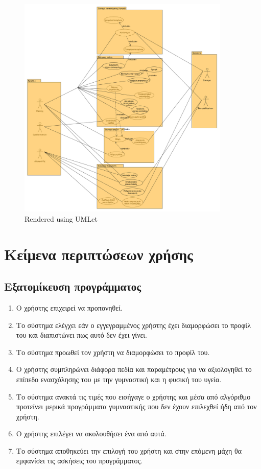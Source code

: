\begin{figure}[htbp]
  
  \centering
    \includegraphics[width=0.9\textwidth]{graphics/uml.png}
    \caption{Rendered using UMLet}
\end{figure}

\newpage
\section{Κείμενα περιπτώσεων χρήσης}
\subsection{Εξατομίκευση προγράμματος}
\label{sec:profile}
\begin{enumerate}
    \item Ο χρήστης επιχειρεί να προπονηθεί.
    \item Το σύστημα ελέγχει εάν ο εγγεγραμμένος χρήστης έχει διαμορφώσει το προφίλ του και διαπιστώνει πως αυτό δεν έχει γίνει.
    \item Το σύστημα προωθεί τον χρήστη να διαμορφώσει το προφίλ του.
    \item Ο χρήστης συμπληρώνει διάφορα πεδία και παραμέτρους για να αξιολογηθεί το επίπεδο ενασχόλησης του με την γυμναστική και η φυσική του υγεία.
    \item Το σύστημα ανακτά τις τιμές που εισήγαγε ο χρήστης και μέσα από αλγόριθμο προτείνει μερικά προγράμματα γυμναστικής που δεν έχουν επιλεχθεί ήδη από τον χρήστη.
    \item Ο χρήστης επιλέγει να ακολουθήσει ένα από αυτά.
    \item Το σύστημα αποθηκεύει την επιλογή του χρήστη και στην επόμενη μάχη θα εμφανίσει τις ασκήσεις του προγράμματος.
\end{enumerate}

